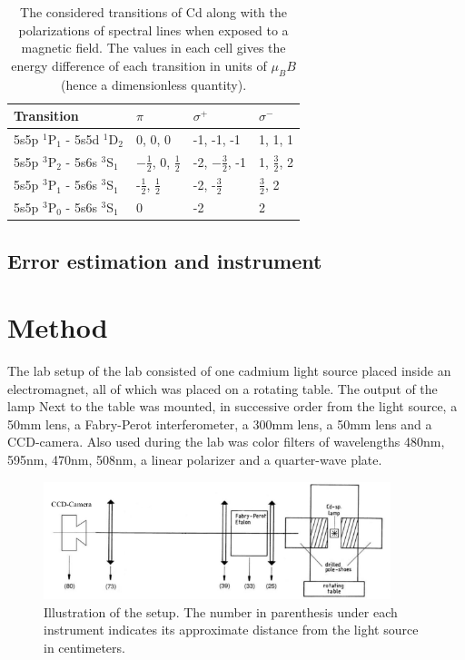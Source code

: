 \documentclass[12pt]{article}
\begin{document}
\begin{table}[h!]
\centering
\begin{tabular}{l|l|l|l}
Transition                      & $\pi$                            & $\sigma^+$             & $\sigma^-$          \\ \hline
5s5p $^1$P$_1$ - 5s5d $^1$D$_2$ & 0, 0, 0                            & -1, -1, -1               & 1, 1, 1               \\
5s5p $^3$P$_2$ - 5s6s $^3$S$_1$ & $-\frac{1}{2}$, 0, $\frac{1}{2}$ & -2, $-\frac{3}{2}$, -1 & 1, $\frac{3}{2}$, 2 \\
5s5p $^3$P$_1$ - 5s6s $^3$S$_1$ & -$\frac{1}{2}$, $\frac{1}{2}$    & -2, -$\frac{3}{2}$     & $\frac{3}{2}$, 2    \\
5s5p $^3$P$_0$ - 5s6s $^3$S$_1$ & 0                                & -2                     & 2                  
\end{tabular}
\caption{The considered transitions of Cd along with the polarizations of spectral lines when exposed to a magnetic field. The values in each cell gives the energy difference of each transition in units of $\mu_B B$ (hence a dimensionless quantity).}
\label{tbl:polarizations}
\end{table}


\subsection{Error estimation and instrument}


\section{Method}
The lab setup of the lab consisted of one cadmium light source placed inside an electromagnet, all of which was placed on a rotating table. The output of the lamp  Next to the table was mounted, in successive order from the light source, a 50mm lens, a Fabry-Perot interferometer, a 300mm lens, a 50mm lens and a CCD-camera. Also used during the lab was color filters of wavelengths 480nm, 595nm, 470nm, 508nm, a linear polarizer and a quarter-wave plate. \\

\begin{figure}[h]
    \centering
    \includegraphics[width=0.9\textwidth]{figure1.png}
    \caption{Illustration of the setup. The number in parenthesis under each instrument indicates its approximate distance from the light source in centimeters.\cite{manual}}
    \label{fig:setup}
\end{figure}
\end{document}
